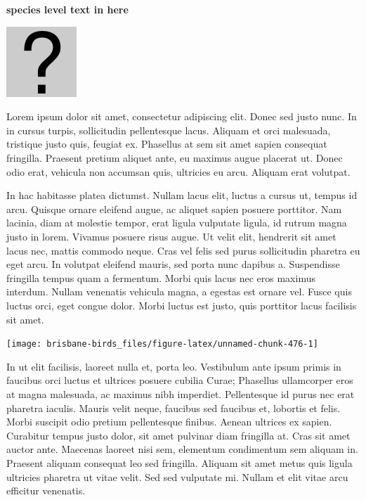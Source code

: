 \documentclass[]{book}
\let\origfigure\figure
\let\endorigfigure\endfigure
\renewenvironment{figure}[1][2] {
  \expandafter\origfigure\expandafter[H]
} {
  \endorigfigure
}
\begin{document}
\textbf{species level text in here}

\begin{figure}
\centering
\includegraphics{assets/missing.png}
\caption{No image for species}
\end{figure}

Lorem ipsum dolor sit amet, consectetur adipiscing elit. Donec sed justo
nunc. In in cursus turpis, sollicitudin pellentesque lacus. Aliquam et
orci malesuada, tristique justo quis, feugiat ex. Phasellus at sem sit
amet sapien consequat fringilla. Praesent pretium aliquet ante, eu
maximus augue placerat ut. Donec odio erat, vehicula non accumsan quis,
ultricies eu arcu. Aliquam erat volutpat.

In hac habitasse platea dictumst. Nullam lacus elit, luctus a cursus ut,
tempus id arcu. Quisque ornare eleifend augue, ac aliquet sapien posuere
porttitor. Nam lacinia, diam at molestie tempor, erat ligula vulputate
ligula, id rutrum magna justo in lorem. Vivamus posuere risus augue. Ut
velit elit, hendrerit sit amet lacus nec, mattis commodo neque. Cras vel
felis sed purus sollicitudin pharetra eu eget arcu. In volutpat eleifend
mauris, sed porta nunc dapibus a. Suspendisse fringilla tempus quam a
fermentum. Morbi quis lacus nec eros maximus interdum. Nullam venenatis
vehicula magna, a egestas est ornare vel. Fusce quis luctus orci, eget
congue dolor. Morbi luctus est justo, quis porttitor lacus facilisis sit
amet.

\begin{figure}
\texttt{[image: brisbane-birds\_files/figure-latex/unnamed-chunk-476-1]} \caption{insert figure caption}\label{fig:unnamed-chunk-476}
\end{figure}

In ut elit facilisis, laoreet nulla et, porta leo. Vestibulum ante ipsum
primis in faucibus orci luctus et ultrices posuere cubilia Curae;
Phasellus ullamcorper eros at magna malesuada, ac maximus nibh
imperdiet. Pellentesque id purus nec erat pharetra iaculis. Mauris velit
neque, faucibus sed faucibus et, lobortis et felis. Morbi suscipit odio
pretium pellentesque finibus. Aenean ultrices ex sapien. Curabitur
tempus justo dolor, sit amet pulvinar diam fringilla at. Cras sit amet
auctor ante. Maecenas laoreet nisi sem, elementum condimentum sem
aliquam in. Praesent aliquam consequat leo sed fringilla. Aliquam sit
amet metus quis ligula ultricies pharetra ut vitae velit. Sed sed
vulputate mi. Nullam et elit vitae arcu efficitur venenatis.
\end{document}
